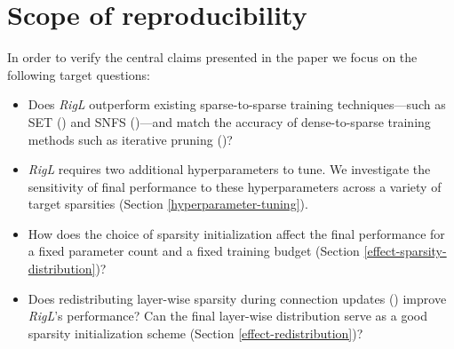 \section{Scope of reproducibility}
\label{sec:claims}


In order to verify the central claims presented in the paper we focus on the following target questions:

\begin{itemize}
    \item Does \textit{RigL} outperform existing sparse-to-sparse training techniques---such as SET (\citet{Mocanu2018SET}) and SNFS (\citet{dettmers2020sparse})---and match the accuracy of dense-to-sparse training methods such as iterative pruning (\citet{to_prune_or_not})?
    
    \item \textit{RigL} requires two additional hyperparameters to tune. We investigate the sensitivity of final performance to these hyperparameters across a variety of target sparsities (Section \ref{hyperparameter-tuning}).
    
    \item How does the choice of sparsity initialization affect the final performance for a fixed parameter count and a fixed training budget (Section \ref{effect-sparsity-distribution})?
    
    \item Does redistributing layer-wise sparsity during connection updates (\citet{dettmers2020sparse}) improve \textit{RigL}'s performance? Can the final layer-wise distribution serve as a good sparsity initialization scheme (Section \ref{effect-redistribution})? 

\end{itemize}

